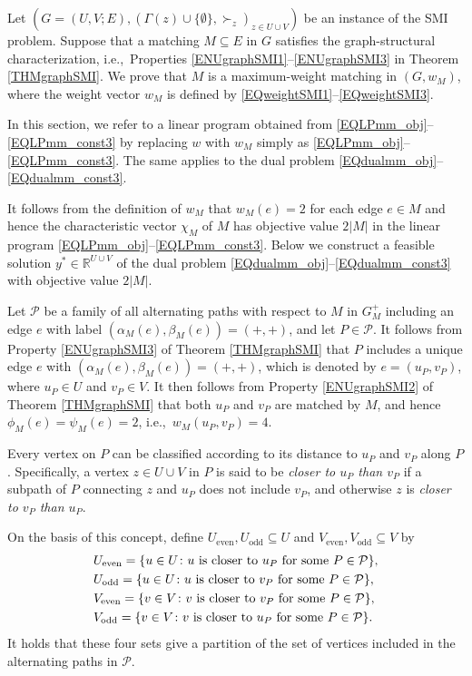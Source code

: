 \documentclass[11pt,a4paper,showkeys]{article}
\theoremstyle{plain}
\theoremstyle{definition}
\newcommand{\RR}{{\mathbb{R}}}
\newcommand{\Ueven}{U_{\mathrm{even}}}
\newcommand{\Uodd}{U_{\mathrm{odd}}}
\newcommand{\Veven}{V_{\mathrm{even}}}
\newcommand{\Vodd}{V_{\mathrm{odd}}}
\begin{document}
Let $(G=(U,V;E),(\Gamma(z)\cup \{\emptyset\},\succ_z)_{z\in U\cup V})$ be an instance of the SMI problem. 
Suppose that a matching $M\subseteq E$ in $G$ satisfies the graph-structural characterization, 
i.e.,\ Properties \ref{ENUgraphSMI1}--\ref{ENUgraphSMI3} in Theorem \ref{THMgraphSMI}. 
We prove that $M$ is a maximum-weight matching in $(G,w_M)$, 
where the weight vector $w_M$ is defined by \eqref{EQweightSMI1}--\eqref{EQweightSMI3}. 


In this section, 
we refer to a linear program obtained from \eqref{EQLPmm_obj}--\eqref{EQLPmm_const3} by  replacing $w$ with $w_M$
simply as \eqref{EQLPmm_obj}--\eqref{EQLPmm_const3}. 
The same applies to the dual problem \eqref{EQdualmm_obj}--\eqref{EQdualmm_const3}. 

It follows from the definition of $w_M$ that 
$w_M(e)=2$ for each edge $e\in M$ 
and hence the characteristic vector $\chi_M$ of $M$ has objective value $2|M|$ in 
the linear program \eqref{EQLPmm_obj}--\eqref{EQLPmm_const3}. 
Below we construct a feasible solution $y^*\in \RR^{U\cup V}$ of the dual problem \eqref{EQdualmm_obj}--\eqref{EQdualmm_const3} 
with objective value $2|M|$. 

Let $\mathcal{P}$ be a family of all alternating paths with respect to $M$ in $G_M^+$ including an edge $e$ 
with label $(\alpha_M(e),\beta_M(e))=(+,+)$, 
and let $P\in \mathcal{P}$. 
It follows from Property \ref{ENUgraphSMI3} of Theorem \ref{THMgraphSMI} that $P$ includes a unique edge $e$ with $(\alpha_M(e),\beta_M(e))=(+,+)$, 
which is denoted by $e=(u_P,v_P)$, 
where $u_P\in U$ and $v_P\in V$. 
It then follows from Property \ref{ENUgraphSMI2} of Theorem \ref{THMgraphSMI} that both $u_P$ and $v_P$ are matched by $M$, 
and hence $\phi_M(e)=\psi_M(e)=2$, 
i.e.,\ $w_M(u_P,v_P)=4$. 


Every vertex on $P$ can be classified according to its distance to $u_P$ and $v_P$ along $P$. 
Specifically, 
a vertex $z \in U\cup V$ in $P$ is said to be \emph{closer to $u_P$ than $v_P$} if a subpath of $P$ connecting $z$ and $u_P$ does not 
include $v_P$, 
and otherwise $z$ is \emph{closer to $v_P$ than $u_P$}. 

On the basis of this concept, 
define $\Ueven, \Uodd \subseteq U$ and $\Veven, \Vodd \subseteq V$ by 
\begin{align*}
    &{}\Ueven = \{u\in U \colon \mbox{$u$ is closer to $u_P$ for some $ P\in \mathcal{P}$}\}, \\
    &{}\Uodd = \{u\in U \colon \mbox{$u$ is closer to $v_P$ for some $ P\in \mathcal{P}$}\}, \\
    &{}\Veven = \{v\in V \colon \mbox{$v$ is closer to $v_P$ for some $ P\in \mathcal{P}$}\}, \\
    &{}\Vodd = \{v\in V \colon \mbox{$v$ is closer to $u_P$ for some $ P\in \mathcal{P}$}\}.
\end{align*}
It holds that these four sets give a partition of the set of vertices included in the alternating paths in $\mathcal{P}$. 
\end{document}
